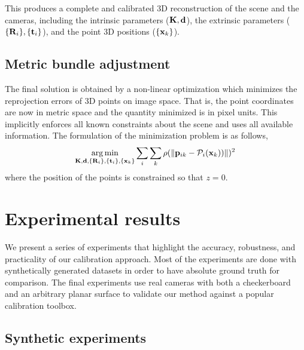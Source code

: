\documentclass[10pt,twocolumn,letterpaper]{article}
\begin{document}
This produces a complete and calibrated 3D reconstruction of the scene and the cameras, including the intrinsic parameters ($\mathbf{K},\mathbf{d}$), the extrinsic parameters ($\lbrace \mathbf{R}_i \rbrace,\lbrace \mathbf{t}_i \rbrace$), and the point 3D positions ($\lbrace \mathbf{x}_k \rbrace$).

\subsection{Metric bundle adjustment}

The final solution is obtained by a non-linear optimization which minimizes the reprojection errors of 3D points on image space. That is, the point coordinates are now in metric space and the quantity minimized is in pixel units. This implicitly enforces all known constraints about the scene and uses all available information. The formulation of the minimization problem is as follows, 
%
\begin{align}
\argmin_{\Km,\dv,\lbrace \Rm_i \rbrace,\lbrace \tv_i \rbrace, \lbrace \xv_k \rbrace} 
%
\sum_i \sum_k \rho(\norm{\pv_{ik} - \Projection_i(\xv_k))})^2 
\end{align}
%
where the position of the points is constrained so that $z=0$. 

\section{Experimental results}
\label{sec:results}

We present a series of experiments that highlight the accuracy, robustness, and practicality of our calibration approach. Most of the experiments are done with synthetically generated datasets in order to have absolute ground truth for comparison. The final experiments use real cameras with both a checkerboard and an arbitrary planar surface to validate our method against a popular calibration toolbox.

\subsection{Synthetic experiments}
\end{document}
